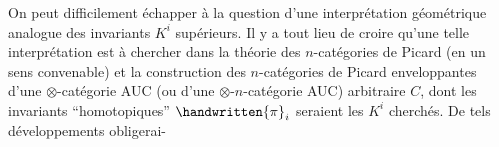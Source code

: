 On peut difficilement échapper à la question d'une interprétation géométrique analogue des invariants $K^{i}$ supérieurs. Il y a tout lieu de croire qu'une telle interprétation est à chercher dans la théorie des $n$-catégories de Picard (en un sens convenable) et la construction des $n$-catégories de Picard enveloppantes d'une $\otimes$-catégorie AUC (ou d'une $\otimes$-$n$-catégorie AUC) arbitraire $C$, dont les invariants ``homotopiques'' $\handwritten{\pi}_{i}$ seraient les $K^{i}$ cherchés. De tels développements obligerai-

